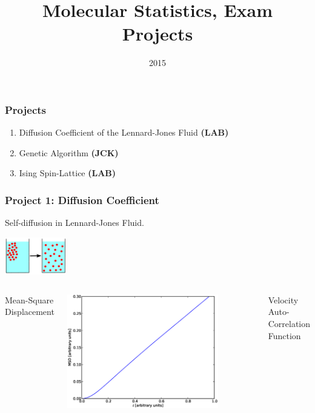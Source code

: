 \documentclass{beamer}
\title[University of Copenhagen]{Molecular Statistics, Exam Projects}
\author{
}
\date{2015}
\begin{document}
\frame[plain]{\titlepage}



\frame
{
    \frametitle{Projects}

    \begin{enumerate}
      \item Diffusion Coefficient of the Lennard-Jones Fluid {\bf (LAB)}
      \item Genetic Algorithm {\bf (JCK)}
      \item Ising Spin-Lattice {\bf (LAB)}
    \end{enumerate}
}

\frame
{
    \frametitle{Project 1: Diffusion Coefficient}
    \centering

    Self-diffusion in Lennard-Jones Fluid.
    \newline

    \includegraphics[width=0.2\textwidth]{images/diffusion_illustration.png}

    \begin{columns}[c]
      \centering

        Mean-Square Displacement

        \includegraphics[width=0.8\textwidth]{images/diffusion_msd.eps}

      \centering

        Velocity Auto-Correlation Function


\end{columns}}
\end{document}
